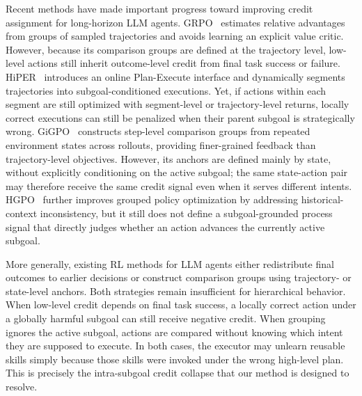 \documentclass{article}
\newcommand{\wei}[1]{\textcolor{red}{#1}}
\begin{document}
Recent methods have made important progress toward improving credit assignment for long-horizon LLM agents. GRPO~\cite{shao2024deepseekmath} estimates relative advantages from groups of sampled trajectories and avoids learning an explicit value critic. However, because its comparison groups are defined at the trajectory level, low-level actions still inherit outcome-level credit from final task success or failure. HiPER~\cite{wang2026subgoal} introduces an online Plan-Execute interface and dynamically segments trajectories into subgoal-conditioned executions. Yet, if actions within each segment are still optimized with segment-level or trajectory-level returns, locally correct executions can still be penalized when their parent subgoal is strategically wrong. GiGPO~\cite{NEURIPS2025_420c9f77} constructs step-level comparison groups from repeated environment states across rollouts, providing finer-grained feedback than trajectory-level objectives. However, its anchors are defined mainly by state, without explicitly conditioning on the active subgoal; the same state-action pair may therefore receive the same credit signal even when it serves different intents. HGPO~\cite{wang2025spa} further improves grouped policy optimization by addressing historical-context inconsistency, but it still does not define a subgoal-grounded process signal that directly judges whether an action advances the currently active subgoal.


More generally, existing RL methods for LLM agents either redistribute final outcomes to earlier decisions or construct comparison groups using trajectory- or state-level anchors. Both strategies remain insufficient for hierarchical behavior. When low-level credit depends on final task success, a locally correct action under a globally harmful subgoal can still receive negative credit. When grouping ignores the active subgoal, actions are compared without knowing which intent they are supposed to execute. In both cases, the executor may unlearn reusable skills simply because those skills were invoked under the wrong high-level plan. This is precisely the intra-subgoal credit collapse that our method is designed to resolve.
\end{document}
